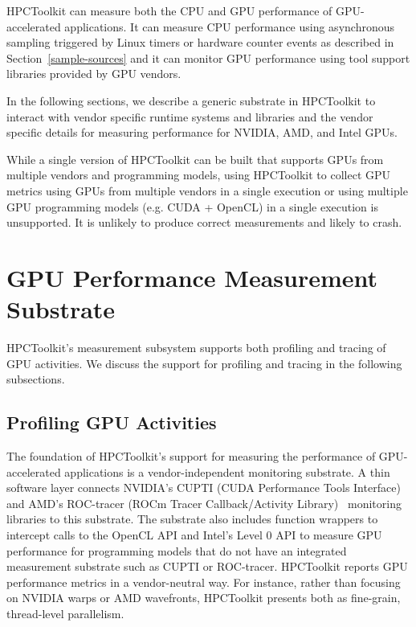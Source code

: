 HPCToolkit can measure both the CPU and GPU performance of GPU-accelerated applications. It can measure CPU performance using asynchronous sampling triggered by Linux timers or hardware counter events as described in 
Section~\ref{sample-sources} and it can monitor GPU performance using tool support libraries provided by GPU vendors.

In the following sections, we describe a generic substrate in HPCToolkit to interact with vendor specific runtime systems and libraries and the vendor specific details for measuring performance for NVIDIA, AMD, and Intel GPUs. 

While a single version of HPCToolkit can be built that supports GPUs from multiple vendors and programming models, using HPCToolkit to collect GPU metrics  using GPUs from multiple vendors in a single execution or using multiple GPU programming models (e.g. CUDA + OpenCL) in a single execution is unsupported. It is  unlikely to produce correct measurements and likely to crash.

\begin{comment}

To measure both CUDA and OpenMP offloading performance, use one of the CUDA events specified above.
Postprocessing GPU Performance Measurements with HPCToolkit

Collecting Program Structure Information Using Binary Analysis
hpcstruct <load module>
Perform binary analysis to recover program structure of your executable or a shared library, as well as any NVIDIA CUBIN GPU binaries that are embedded in ELF segments. (Clang directly embeds NVIDIA CUBINs in ELF segments.)
hpcstruct hpctoolkit-<your application>-measurements
\end{comment}

\section{GPU Performance Measurement Substrate}

HPCToolkit's measurement subsystem supports both profiling and tracing of GPU activities. We discuss the support for profiling and tracing in the following subsections. 

\subsection{Profiling GPU Activities}

The foundation of HPCToolkit's support for measuring the performance of GPU-accelerated applications is a vendor-independent monitoring substrate. A thin software layer connects NVIDIA's CUPTI (CUDA Performance Tools Interface)~\cite{cupti} and AMD's ROC-tracer (ROCm Tracer Callback/Activity Library)~\cite{roctracer} monitoring libraries to this substrate. The substrate also includes function wrappers to intercept calls to the OpenCL API and Intel's Level 0 API to measure GPU performance for programming models that do not have an integrated measurement substrate 
such as CUPTI or ROC-tracer. 
HPCToolkit reports GPU performance metrics in a vendor-neutral way. For instance, rather than focusing on NVIDIA warps or AMD wavefronts, HPCToolkit presents both as fine-grain, thread-level parallelism.

